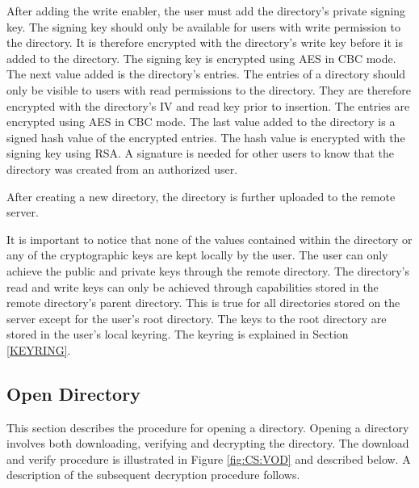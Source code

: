 \documentclass[pdftex,english,10pt,b5paper,twoside]{book}
\begin{document}
After adding the write enabler, the user must add the directory's private
signing key. The signing key should only be available for users with write
permission to the directory. It is therefore encrypted with the directory's
write key before it is added to the directory. The signing key is encrypted using \ac{AES} in
\ac{CBC} mode. The next value added is the directory's entries. The entries of a
directory should only be visible to users with read permissions to
the directory. They are therefore encrypted with the directory's \ac{IV} and read
key prior to insertion. The entries are encrypted using \ac{AES} in \ac{CBC} mode. The
last value added to the directory is a signed hash value of the encrypted
entries. The hash value is encrypted with the signing key using \ac{RSA}. A
signature is needed for other users to know that the directory was created from
an authorized user.

After creating a new directory, the directory is further uploaded to the remote
server.

It is important to notice that none of the values contained within the
directory or any of the cryptographic keys are kept locally by the user. The
user can only achieve the public and private keys through the remote directory.
The directory's read and write keys can only be achieved through capabilities stored
in the remote directory's parent directory. This is true for all directories
stored on the server except for the user's root directory. The keys to the
root directory are stored in the user's local keyring. The keyring is explained
in Section \ref{KEYRING}.

\subsection{Open Directory}

This section describes the procedure for opening a directory. Opening a
directory involves both downloading, verifying and decrypting the directory. The
download and verify procedure is illustrated in Figure \ref{fig:CS:VOD} and
described below. A description of the subsequent decryption procedure follows.
\end{document}
